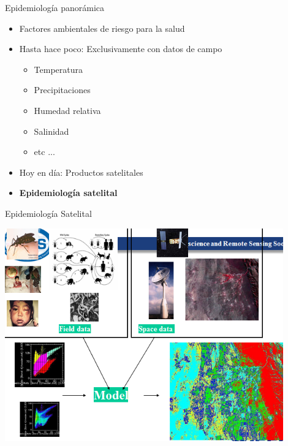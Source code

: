 \documentclass[10pt]{beamer}
\begin{document}
\begin{frame}{Epidemiología panorámica}

  \begin{itemize}[<+->]
  \item Factores ambientales de riesgo para la salud
  \item Hasta hace poco: Exclusivamente con datos de campo
    \begin{itemize}
    \item Temperatura
    \item Precipitaciones
    \item Humedad relativa
    \item Salinidad
    \item etc ...
    \end{itemize}
  \item Hoy en día: Productos satelitales
  \item[] \begin{center} \textbf{Epidemiología satelital} \end{center}

  \end{itemize}

\end{frame}

\begin{frame}{Epidemiología Satelital}
  \begin{center}
    \includegraphics[width=0.9\textwidth]{global.png}
  \end{center}
\end{frame}
\end{document}
